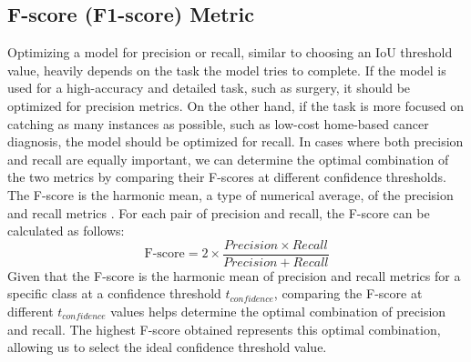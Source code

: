 \subsection{F-score (F1-score) Metric}  \label{subsec:f_score}
Optimizing a model for precision or recall, similar to choosing an IoU threshold value, heavily depends on the task the model tries to complete. If the model is used for a high-accuracy and detailed task, such as surgery, it should be optimized for precision metrics. On the other hand, if the task is more focused on catching as many instances as possible, such as low-cost home-based cancer diagnosis, the model should be optimized for recall. In cases where both precision and recall are equally important, we can determine the optimal combination of the two metrics by comparing their F-scores at different confidence thresholds. The F-score is the harmonic mean, a type of numerical average, of the precision and recall metrics \cite{fscore_2017}. For each pair of precision and recall, the F-score can be calculated as follows:
\begin{equation}
    \text{F-score} = 2 \times \frac{Precision \times Recall}{Precision + Recall}
\end{equation}
Given that the F-score is the harmonic mean of precision and recall metrics for a specific class at a confidence threshold $t_{confidence}$, comparing the F-score at different $t_{confidence}$ values helps determine the optimal combination of precision and recall. The highest F-score obtained represents this optimal combination, allowing us to select the ideal confidence threshold value.

